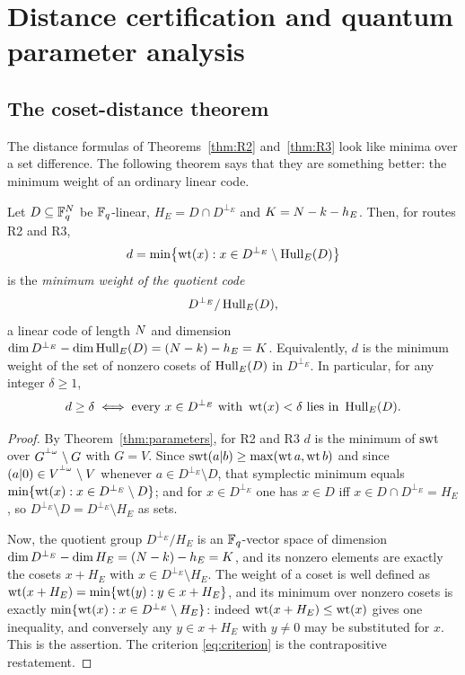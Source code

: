 \section{Distance certification and quantum parameter analysis}
\label{sec:cert}

\subsection{The coset-distance theorem}

The distance formulas of Theorems~\ref{thm:R2} and~\ref{thm:R3} look like
minima over a set difference. The following theorem says that they are
something better: the minimum weight of an ordinary linear code.

\begin{theorem}\label{thm:cosetdistance}
Let $D\subseteq\mathbb F_q^{N}$ be $\mathbb F_q$-linear, $H_E=D\cap D^{\perp_E}$ and
$K=N-k-h_E$. Then, for routes R2 and R3,
\[
  d=\min\bigl\{\operatorname{wt}(x):x\in D^{\perp_E}\setminus\operatorname{Hull}_E(D)\bigr\}
\]
is the \emph{minimum weight of the quotient code}
\[
  D^{\perp_E}/\operatorname{Hull}_E(D),
\]
a linear code of length $N$ and dimension
$\dim D^{\perp_E}-\dim\operatorname{Hull}_E(D)=(N-k)-h_E=K$. Equivalently, $d$ is the
minimum weight of the set of nonzero cosets of $\operatorname{Hull}_E(D)$ in $D^{\perp_E}$.
In particular, for any integer $\delta\ge1$,
\begin{equation}\label{eq:criterion}
  d\ge\delta
  \iff
  \text{every }x\in D^{\perp_E}\text{ with }\operatorname{wt}(x)<\delta
  \text{ lies in }\operatorname{Hull}_E(D).
\end{equation}
\end{theorem}

\begin{proof}
By Theorem~\ref{thm:parameters}, for R2 and R3
$d$ is the minimum of $\operatorname{swt}$ over $G^{{}^{\perp_\omega}}\setminus G$ with $G=V$.
Since $\operatorname{swt}(a|b)\ge\max(\operatorname{wt} a,\operatorname{wt} b)$ and since
$(a|0)\in V^{{}^{\perp_\omega}}\setminus V$ whenever $a\in D^{\perp_E}\setminus D$,
that symplectic minimum equals
$\min\{\operatorname{wt}(x):x\in D^{\perp_E}\setminus D\}$; and for $x\in D^{\perp_E}$ one
has $x\in D$ iff $x\in D\cap D^{\perp_E}=H_E$, so
$D^{\perp_E}\setminus D=D^{\perp_E}\setminus H_E$ as sets.

Now, the quotient group $D^{\perp_E}/H_E$ is an $\mathbb F_q$-vector space of
dimension $\dim D^{\perp_E}-\dim H_E=(N-k)-h_E=K$, and its nonzero elements
are exactly the cosets $x+H_E$ with $x\in D^{\perp_E}\setminus H_E$. The weight
of a coset is well defined as
$\operatorname{wt}(x+H_E)=\min\{\operatorname{wt}(y):y\in x+H_E\}$, and its minimum over nonzero cosets is
exactly $\min\{\operatorname{wt}(x):x\in D^{\perp_E}\setminus H_E\}$: indeed
$\operatorname{wt}(x+H_E)\le\operatorname{wt}(x)$ gives one inequality, and conversely any $y\in x+H_E$
with $y\ne0$ may be substituted for $x$. This is the assertion. The criterion
\eqref{eq:criterion} is the contrapositive restatement.
\end{proof}

